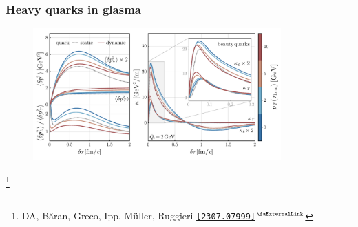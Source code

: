 \documentclass[aspectratio=169,11pt,usenames,dvipsnames]{beamer}
\renewcommand{\thefootnote}{\color{customblue}\faPaperPlaneO}
\newcommand\blfootnote[1]{%
  \begingroup
  \renewcommand\thefootnote{}\footnote{#1}%
  \addtocounter{footnote}{-1}%
  \endgroup
}
\begin{document}
    


\begin{frame}
    \frametitle{Heavy quarks in glasma}
    \begin{center}
        \begin{figure}
            \centering
            \includegraphics[width=0.85\textwidth]{images/hp23_mom_broad_kappa_anis_wong_vs_kappa.pdf}
        \end{figure}
    \end{center}
    \vspace{-20pt}
    \blfootnote{\scriptsize DA, Băran, Greco, Ipp, Müller, Ruggieri  \href{https://arxiv.org/abs/2307.07999}{{\color{Mahogany}\texttt{[2307.07999]}$^\text{\scalebox{0.9}{\faExternalLink}}$}}}
\end{frame}

\end{document}
